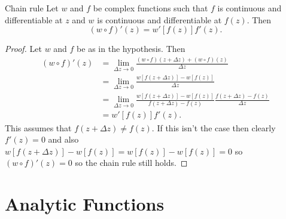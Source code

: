 \documentclass{article}
\begin{document}
    \begin{lemma}{Chain rule}{}
        Let \(w\) and \(f\) be complex functions such that \(f\) is continuous and differentiable at \(z\) and \(w\) is continuous and differentiable at \(f(z)\).
        Then
        \[(w\circ f)'(z) = w'[f(z)]f'(z).\]
    \end{lemma}
    \begin{proof}
        Let \(w\) and \(f\) be as in the hypothesis.
        Then
        \begin{align*}
            (w \circ f)'(z) &= \lim_{\Delta z \to 0} \frac{(w \circ f)(z + \Delta z) + (w \circ f)(z)}{\Delta z}\\
            &= \lim_{\Delta z \to 0} \frac{w[f(z + \Delta z)] - w[f(z)]}{\Delta z}\\
            &= \lim_{\Delta z\to 0} \frac{w[f(z + \Delta z)] - w[f(z)]}{f(z + \Delta z) - f(z)}\frac{f(z + \Delta z) - f(z)}{\Delta z}\\
            &= w'[f(z)]f'(z).
        \end{align*}
        This assumes that \(f(z + \Delta z) \ne f(z)\).
        If this isn't the case then clearly \(f'(z) = 0\) and also \(w[f(z + \Delta z)] - w[f(z)] = w[f(z)] - w[f(z)] = 0\) so \((w\circ f)'(z) = 0\) so the chain rule still holds.
    \end{proof}
    
    \section{Analytic Functions}
\end{document}
